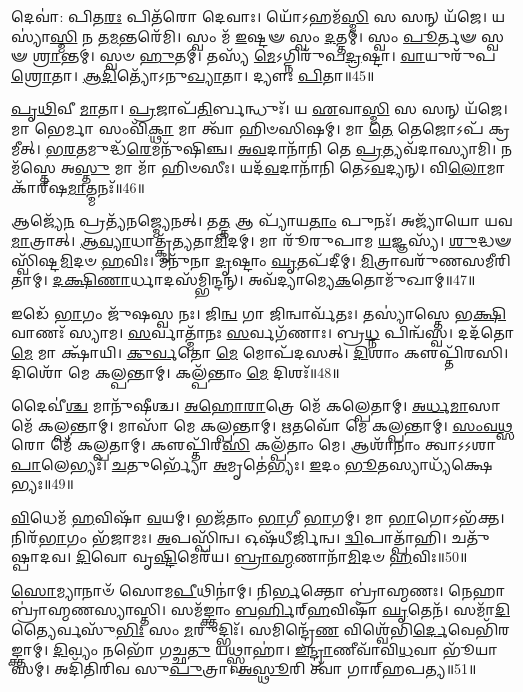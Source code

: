 𑌦𑍇𑌵𑌾॑: 𑌪𑌿𑌤\-\ul{𑌰𑌃} 𑌪𑌿𑌤᳴𑌰𑍋 𑌦𑍇𑌵𑌾𑌃।
𑌯𑍋᳴𑌽𑌹𑌮᳴\-\ul{𑌸𑍍𑌮𑌿} 𑌸 𑌸𑌨𑍍 𑌯᳴𑌜𑍇।
𑌯𑌸𑍍𑌯𑌾॑\-\ul{𑌸𑍍𑌮𑌿} 𑌨 𑌤\-\ul{𑌮}\-𑌨𑍍𑌤𑌰𑍇᳴𑌮𑌿।
𑌸𑍍𑌵𑌂 𑌮᳴ \ul{𑌇}\-𑌷𑍍𑌟𑍟 𑌸𑍍𑌵𑌂 \ul{𑌦}\-𑌤𑍍𑌤𑌮𑍍।
𑌸𑍍𑌵𑌂 \ul{𑌪𑍂}\-𑌰𑍍𑌤𑍟 𑌸𑍍𑌵𑍟 \ul{𑌶𑍍𑌰𑌾}\-𑌨𑍍𑌤𑌮𑍍।
𑌸𑍍𑌵𑍞 \ul{𑌹𑍁}\-𑌤𑌮𑍍।
𑌤𑌸𑍍𑌯᳴ \ul{𑌮𑍇}\-\-𑌽𑌗𑍍𑌨𑌿𑌰𑍁᳴𑌪\-\ul{𑌦𑍍𑌰}\-𑌷𑍍𑌟𑌾।
\-\ul{𑌵𑌾}\-𑌯𑍁𑌰𑍁᳴𑌪\-\ul{𑌶𑍍𑌰𑍋}\-𑌤𑌾।
\-\ul{𑌆}\-\-\ul{𑌦𑌿}\-𑌤𑍍𑌯𑍋᳴\-𑌽𑌨𑍁\-\ul{𑌖𑍍𑌯𑌾}\-𑌤𑌾।
𑌦𑍍𑌯𑍗𑌃 \ul{𑌪𑌿}\-𑌤𑌾॥45॥

\-\ul{𑌪𑍃}\-\-\ul{𑌥𑌿}\-𑌵𑍀 \ul{𑌮𑌾}\-𑌤𑌾।
\-\ul{𑌪𑍍𑌰}\-𑌜𑌾𑌪᳴\-\ul{𑌤𑌿}\-𑌰𑍍𑌬𑌨𑍍𑌧𑍁𑌃᳴।
𑌯 \ul{𑌏}\-𑌵𑌾\-\ul{𑌸𑍍𑌮𑌿} 𑌸 𑌸𑌨𑍍 𑌯᳴𑌜𑍇।
𑌮𑌾 𑌭𑍇𑌰𑍍𑌮𑌾 𑌸𑌂𑌵𑌿᳴\-\ul{𑌕𑍍𑌥𑌾} 𑌮𑌾 𑌤𑍍𑌵𑌾᳴ 𑌹𑌿𑍞𑌸𑌿𑌷𑌮𑍍।
𑌮𑌾 \ul{𑌤𑍇} 𑌤𑍇𑌜𑍋𑌽𑌪᳴ 𑌕𑍍𑌰𑌮𑍀𑌤𑍍।
\-\ul{𑌭}\-\-\ul{𑌰}\-𑌤𑌮𑍁𑌦𑍍𑌧᳴\-\ul{𑌰𑍇}\-𑌮𑌨𑍁᳴𑌷𑌿𑌞𑍍𑌚।
\-\ul{𑌅}\-\-\ul{𑌵}\-𑌦𑌾𑌨𑌾᳴𑌨𑌿 𑌤𑍇 \ul{𑌪𑍍𑌰}\-𑌤𑍍𑌯𑌵᳴𑌦𑌾𑌸𑍍𑌯𑌾𑌮𑌿।
𑌨𑌮᳴𑌸𑍍𑌤𑍇 𑌅\-\ul{𑌸𑍍𑌤𑍁} 𑌮𑌾 𑌮𑌾᳴ 𑌹𑌿𑍞𑌸𑍀𑌃।
𑌯𑌦᳴\-\ul{𑌵}\-𑌦𑌾𑌨𑌾᳴𑌨𑌿 𑌤𑍇𑌽\-\ul{𑌵}\-𑌦𑍍𑌯𑌨𑍍।
𑌵𑌿\-\ul{𑌲𑍋}\-𑌮𑌾𑌕𑌾᳴𑌰𑍍‌\mbox{}𑌷\-\ul{𑌮𑌾}\-𑌤𑍍𑌮𑌨𑌃᳴॥46॥

𑌆𑌜𑍍𑌯𑍇᳴\-\ul{𑌨} 𑌪𑍍𑌰𑌤𑍍𑌯᳴𑌨𑌜𑍍𑌮𑍍𑌯𑍇𑌨𑌤𑍍।
𑌤\-\ul{𑌤𑍍𑌤} 𑌆 𑌪𑍍𑌯𑌾᳴𑌯\-\ul{𑌤𑌾𑌂} 𑌪𑍁𑌨𑌃᳴।
𑌅𑌜𑍍𑌯𑌾᳴𑌯𑍋 𑌯𑌵\-\ul{𑌮𑌾}\-𑌤𑍍𑌰𑌾𑌤𑍍।
\-\ul{𑌆}\-\-\ul{𑌵𑍍𑌯𑌾}\-𑌧𑌾𑌤𑍍𑌕𑍃᳴𑌤𑍍𑌯𑌤𑌾\-\ul{𑌮𑌿}\-𑌦𑌮𑍍।
𑌮𑌾 𑌰𑍂᳴𑌰𑍁𑌪𑌾𑌮 \ul{𑌯}\-𑌜𑍍𑌞𑌸𑍍𑌯᳴।
\-\ul{𑌶𑍁}\-𑌦𑍍𑌧𑍟 𑌸𑍍𑌵𑌿᳴𑌷𑍍𑌟\-\ul{𑌮𑌿}\-𑌦𑍞 \ul{𑌹}\-𑌵𑌿𑌃।
𑌮𑌨𑍁᳴𑌨𑌾 \ul{𑌦𑍃}\-𑌷𑍍𑌟𑌾𑌂 \ul{𑌘𑍃}\-𑌤𑌪᳴𑌦𑍀𑌮𑍍।
\-\ul{𑌮𑌿}\-𑌤𑍍𑌰𑌾𑌵𑌰𑍁᳴𑌣𑌸𑌮𑍀𑌰𑌿𑌤𑌾𑌮𑍍।
\-\ul{𑌦}\-\-\ul{𑌕𑍍𑌷𑌿}\-\-\ul{𑌣𑌾}\-𑌰𑍍𑌧𑌾𑌦𑌸᳴𑌮𑍍𑌭𑌿𑌨𑍍𑌦𑌨𑍍।
𑌅𑌵᳴𑌦𑍍𑌯𑌾𑌮𑍍𑌯𑍇\-\-\ul{𑌕}\-𑌤𑍋𑌮𑍁᳴𑌖𑌾𑌮𑍍॥47॥

𑌇𑌡𑍇᳴ \ul{𑌭𑌾}\-𑌗𑌂 𑌜𑍁᳴𑌷𑌸𑍍𑌵 𑌨𑌃।
𑌜𑌿\-\ul{𑌨𑍍𑌵} 𑌗𑌾 𑌜𑌿𑌨𑍍𑌵𑌾𑌰𑍍𑌵᳴𑌤𑌃।
𑌤𑌸𑍍𑌯𑌾॑𑌸𑍍𑌤𑍇 𑌭\-\ul{𑌕𑍍𑌷𑌿}\-𑌵𑌾𑌣𑌃᳴ 𑌸𑍍𑌯𑌾𑌮।
\-\ul{𑌸}\-𑌰𑍍𑌵𑌾𑌤𑍍𑌮𑌾᳴𑌨𑌃 \ul{𑌸}\-𑌰𑍍𑌵𑌗᳴𑌣𑌾𑌃।
𑌬𑍍𑌰\-\ul{𑌧𑍍𑌨} 𑌪𑌿𑌨𑍍𑌵᳴𑌸𑍍𑌵।
𑌦𑌦᳴𑌤𑍋 \ul{𑌮𑍇} 𑌮𑌾 𑌕𑍍𑌷𑌾᳴𑌯𑌿।
\-\ul{𑌕𑍁}\-\-\ul{𑌰𑍍𑌵}\-𑌤𑍋 \ul{𑌮𑍇} 𑌮𑍋𑌪᳴𑌦𑌸𑌤𑍍।
\-\ul{𑌦𑌿}\-𑌶𑌾𑌂 𑌕𑍢𑌪𑍍𑌤𑌿᳴𑌰𑌸𑌿।
𑌦𑌿𑌶𑍋᳴ 𑌮𑍇 𑌕𑌲𑍍𑌪𑌨𑍍𑌤𑌾𑌮𑍍।
𑌕𑌲𑍍𑌪᳴𑌨𑍍𑌤𑌾𑌂 \ul{𑌮𑍇} 𑌦𑌿𑌶𑌃᳴॥48॥

𑌦𑍈𑌵𑍀॑\-\ul{𑌶𑍍𑌚} 𑌮𑌾𑌨𑍁᳴𑌷𑍀𑌶𑍍𑌚।
\-\ul{𑌅}\-\-\ul{𑌹𑍋}\-\-\ul{𑌰𑌾}\-𑌤𑍍𑌰𑍇 𑌮𑍇᳴ 𑌕𑌲𑍍𑌪𑍇𑌤𑌾𑌮𑍍।
\-\ul{𑌅}\-\-\ul{𑌰𑍍𑌧}\-\-\ul{𑌮𑌾}\-𑌸𑌾 𑌮𑍇᳴ 𑌕𑌲𑍍𑌪𑌨𑍍𑌤𑌾𑌮𑍍।
𑌮𑌾𑌸𑌾᳴ 𑌮𑍇 𑌕𑌲𑍍𑌪𑌨𑍍𑌤𑌾𑌮𑍍।
\-\ul{𑌋}\-𑌤𑌵𑍋᳴ 𑌮𑍇 𑌕𑌲𑍍𑌪𑌨𑍍𑌤𑌾𑌮𑍍।
\-\ul{𑌸𑌂}\-\-\ul{𑌵}\-\-\ul{𑌥𑍍𑌸}\-𑌰𑍋 𑌮𑍇᳴ 𑌕𑌲𑍍𑌪𑌤𑌾𑌮𑍍।
𑌕𑍢𑌪𑍍𑌤𑌿᳴𑌰\-\ul{𑌸𑌿} 𑌕𑌲𑍍𑌪᳴𑌤𑌾𑌂 𑌮𑍇।
𑌆𑌶𑌾᳴𑌨𑌾𑌂 𑌤𑍍𑌵𑌾\-𑌽𑌽𑌶𑌾\-\ul{𑌪𑌾}\-𑌲𑍇𑌭𑍍𑌯𑌃᳴।
\-\ul{𑌚}\-𑌤𑍁𑌰𑍍𑌭𑍍𑌯𑍋᳴ \ul{𑌅}\-𑌮𑍃𑌤𑍇॑𑌭𑍍𑌯𑌃।
\-\ul{𑌇}\-𑌦𑌂 \ul{𑌭𑍂}\-𑌤𑌸𑍍𑌯𑌾𑌧𑍍𑌯᳴𑌕𑍍𑌷𑍇𑌭𑍍𑌯𑌃॥49॥

\-\ul{𑌵𑌿}\-𑌧𑍇𑌮᳴ \ul{𑌹}\-𑌵𑌿𑌷𑌾᳴ \ul{𑌵}\-𑌯𑌮𑍍।
𑌭𑌜᳴𑌤𑌾𑌂 \ul{𑌭𑌾}\-𑌗𑍀 \ul{𑌭𑌾}\-𑌗𑌮𑍍।
𑌮𑌾 \ul{𑌭𑌾}\-𑌗𑍋\-𑌽𑌭᳴𑌕𑍍𑌤।
𑌨𑌿𑌰᳴\-\ul{𑌭𑌾}\-𑌗𑌂 𑌭᳴𑌜𑌾𑌮𑌃।
\-\ul{𑌅}\-𑌪𑌸𑍍𑌪𑌿᳴𑌨𑍍𑌵।
𑌓𑌷᳴𑌧𑍀𑌰𑍍𑌜𑌿𑌨𑍍𑌵।
\-\ul{𑌦𑍍𑌵𑌿}\-𑌪𑌾𑌤𑍍𑌪𑌾᳴𑌹𑌿।
𑌚𑌤𑍁᳴𑌷𑍍𑌪𑌾𑌦𑌵।
\-\ul{𑌦𑌿}\-𑌵𑍋 𑌵𑍃\-\ul{𑌷𑍍𑌟𑌿}\-𑌮𑍇𑌰᳴𑌯।
\-\ul{𑌬𑍍𑌰𑌾}\-\-\ul{𑌹𑍍𑌮}\-𑌣𑌾𑌨𑌾᳴\-\ul{𑌮𑌿}\-𑌦𑍞 \ul{𑌹}\-𑌵𑌿𑌃॥50॥

\-\ul{𑌸𑍋}\-𑌮𑍍𑌯𑌾𑌨𑌾𑍞᳴ 𑌸𑍋𑌮\-\ul{𑌪𑍀}\-𑌥𑌿𑌨𑌾॑𑌮𑍍।
𑌨𑌿\-\ul{𑌰𑍍𑌭}\-𑌕𑍍𑌤𑍋 𑌬𑍍𑌰𑌾॑𑌹𑍍𑌮𑌣𑌃।
𑌨𑍇𑌹𑌾 𑌬𑍍𑌰𑌾॑𑌹𑍍𑌮𑌣𑌸𑍍𑌯𑌾𑌸𑍍𑌤𑌿।
𑌸𑌮᳴𑌙𑍍𑌕𑍍𑌤𑌾𑌂 \ul{𑌬}\-\-\ul{𑌰𑍍}\-𑌹𑌿𑌰𑍍‌\mbox{}\-\ul{𑌹}\-𑌵𑌿𑌷𑌾᳴ \ul{𑌘𑍃}\-𑌤𑍇𑌨᳴।
𑌸𑌮𑌾᳴\-\ul{𑌦𑌿}\-𑌤𑍍𑌯𑍈𑌰𑍍𑌵𑌸𑍁᳴\-\ul{𑌭𑌿𑌃} 𑌸𑌂 \ul{𑌮}\-𑌰𑍁𑌦𑍍𑌭𑌿𑌃᳴।
𑌸𑌮𑌿𑌨𑍍𑌦𑍍𑌰𑍇᳴\-\ul{𑌣} 𑌵𑌿𑌶𑍍𑌵𑍇᳴𑌭𑌿\-\ul{𑌰𑍍𑌦𑍇}\-𑌵𑍇𑌭𑌿᳴𑌰𑌙𑍍𑌕𑍍𑌤𑌾𑌮𑍍।
\-\ul{𑌦𑌿}\-𑌵𑍍𑌯𑌂 𑌨𑌭𑍋᳴ 𑌗𑌚𑍍𑌛\-\ul{𑌤𑍁} 𑌯𑌥𑍍𑌸𑍍𑌵𑌾𑌹𑌾॑।
\-\ul{𑌇}\-\-\ul{𑌨𑍍𑌦𑍍𑌰𑌾}\-𑌣𑍀𑌵𑌾᳴𑌵𑌿\-\ul{𑌧}\-𑌵𑌾 𑌭𑍂᳴𑌯𑌾𑌸𑌮𑍍।
𑌅𑌦𑌿᳴𑌤𑌿𑌰𑌿𑌵 𑌸𑍁\-\ul{𑌪𑍁}\-𑌤𑍍𑌰𑌾।
\-\ul{𑌅}\-\-\ul{𑌸𑍍𑌥𑍂}\-𑌰𑌿 𑌤𑍍𑌵𑌾᳴ 𑌗𑌾𑌰𑍍‌\mbox{}𑌹𑌪𑌤𑍍𑌯॥51॥

